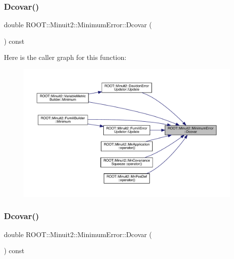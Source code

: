 \subsubsection{\texorpdfstring{Dcovar()}{Dcovar()}\hspace{0.1cm}{\footnotesize\ttfamily [1/2]}}
{\footnotesize\ttfamily double R\+O\+O\+T\+::\+Minuit2\+::\+Minimum\+Error\+::\+Dcovar (\begin{DoxyParamCaption}{ }\end{DoxyParamCaption}) const\hspace{0.3cm}{\ttfamily [inline]}}

Here is the caller graph for this function\+:\nopagebreak
\begin{figure}[H]
\begin{center}
\leavevmode
\includegraphics[width=350pt]{d5/d32/classROOT_1_1Minuit2_1_1MinimumError_acd4dec46c23542a2b79183a6d5fe6679_icgraph}
\end{center}
\end{figure}
\mbox{\label{classROOT_1_1Minuit2_1_1MinimumError_acd4dec46c23542a2b79183a6d5fe6679}} 
\subsubsection{\texorpdfstring{Dcovar()}{Dcovar()}\hspace{0.1cm}{\footnotesize\ttfamily [2/2]}}
{\footnotesize\ttfamily double R\+O\+O\+T\+::\+Minuit2\+::\+Minimum\+Error\+::\+Dcovar (\begin{DoxyParamCaption}{ }\end{DoxyParamCaption}) const\hspace{0.3cm}{\ttfamily [inline]}}

